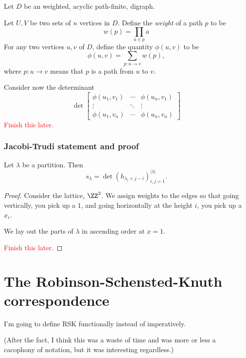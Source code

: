 \documentclass{article}
\begin{document}
\begin{theorem} 
    Let $D$ be an weighted, acyclic path-finite, digraph.

    Let $U, V$ be two sets of $n$ vertices in $D$. Define the \textit{weight} of a path $p$ to be 
    \[
        w(p) = \prod_{a \in p} a
    \]
    For any two vertices $u, v$ of $D$, define the quantity $\phi(u, v)$ to be
    \[
        \phi(u,v) = \sum_{p:u \rightarrow v} w(p),
    \]
    where $p: u \rightarrow v$ means that $p$ is a path from $u$ to $v$.

    Consider now the determinant 
    \[
        \det \begin{bmatrix}
            \phi(u_1, v_1) & \cdots & \phi(u_n, v_1) \\
             \vdots & \ddots & \vdots \\
            \phi(u_1, v_n) & \cdots & \phi(u_n, v_n)
        \end{bmatrix}
    \]
    \textcolor{red}{Finish this later.}
\end{theorem}

\subsubsection{Jacobi-Trudi statement and proof}

\begin{theorem} Let $\lambda$ be a partition. Then
    \[
        s_\lambda = \det(h_{\lambda_i+j-i})_{i,j=1}^{|\lambda|}.
    \]
\end{theorem}

\begin{proof}
    Consider the lattice, $\ZZ^2$. We assign weights to the edges so that going vertically, you pick up a $1$, and going horizontally at the height $i$, you pick up a $x_i$.

    We lay out the parts of $\lambda$ in ascending order at $x=1$.

    \textcolor{red}{Finish this later.}
\end{proof}

\section{The Robinson-Schensted-Knuth correspondence}

I'm going to define RSK functionally instead of imperatively. 

(After the fact, I think this was a waste of time and was more or less a cacophony of notation, but it was interesting regardless.)
\end{document}
